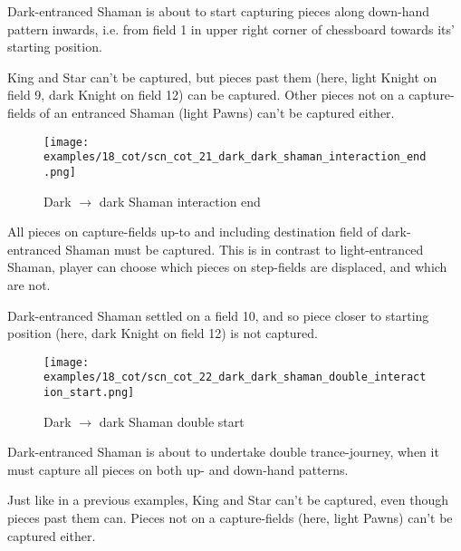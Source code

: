 Dark-entranced Shaman is about to start capturing pieces along down-hand pattern inwards,
i.e. from field 1 in upper right corner of chessboard towards its' starting position.

King and Star can't be captured, but pieces past them (here, light Knight on field 9, dark Knight
on field 12) can be captured. Other pieces not on a capture-fields of an entranced Shaman (light
Pawns) can't be captured either.

\clearpage %

\noindent
\begin{figure}[!h]
\texttt{[image: examples/18\_cot/scn\_cot\_21\_dark\_dark\_shaman\_interaction\_end.png]}
\caption{Dark $\rightarrow$ dark Shaman interaction end}
\label{fig:scn_cot_21_dark_dark_shaman_interaction_end}
\end{figure}

All pieces on capture-fields up-to and including destination field of dark-entranced Shaman
must be captured. This is in contrast to light-entranced Shaman, player can choose which
pieces on step-fields are displaced, and which are not.

Dark-entranced Shaman settled on a field 10, and so piece closer to starting position (here,
dark Knight on field 12) is not captured.

\clearpage %

\noindent
\begin{figure}[!h]
\texttt{[image: examples/18\_cot/scn\_cot\_22\_dark\_dark\_shaman\_double\_interaction\_start.png]}
\caption{Dark $\rightarrow$ dark Shaman double start}
\label{fig:scn_cot_22_dark_dark_shaman_double_interaction_start}
\end{figure}

Dark-entranced Shaman is about to undertake double trance-journey, when it must capture all
pieces on both up- and down-hand patterns.

Just like in a previous examples, King and Star can't be captured, even though pieces past
them can. Pieces not on a capture-fields (here, light Pawns) can't be captured either.

\clearpage %

